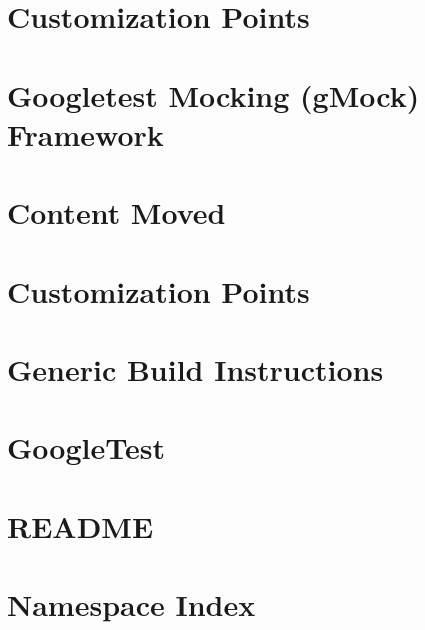 \let\mypdfximage\pdfximage\def\pdfximage{\immediate\mypdfximage}\documentclass[twoside]{book}
\newcommand{\+}{\discretionary{\mbox{\scriptsize$\hookleftarrow$}}{}{}}
\begin{document}
\chapter{Customization Points}
\label{md_build_googletest-src_googlemock_include_gmock_internal_custom_README}

\chapter{Googletest Mocking (g\+Mock) Framework}
\label{md_build_googletest-src_googlemock_README}

\chapter{Content Moved}
\label{md_build_googletest-src_googletest_docs_README}

\chapter{Customization Points}
\label{md_build_googletest-src_googletest_include_gtest_internal_custom_README}

\chapter{Generic Build Instructions}
\label{md_build_googletest-src_googletest_README}

\chapter{Google\+Test}
\label{md_build_googletest-src_README}

\chapter{R\+E\+A\+D\+ME}
\label{md_README}

\chapter{Namespace Index}

\end{document}
